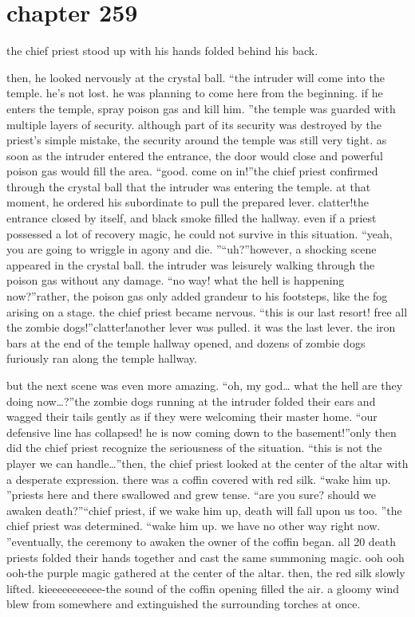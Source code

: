 \section{chapter 259}

                            the chief priest stood up with his hands folded behind his back.





then, he looked nervously at the crystal ball.
“the intruder will come into the temple.
 he’s not lost.
 he was planning to come here from the beginning.
 if he enters the temple, spray poison gas and kill him.
”the temple was guarded with multiple layers of security.
 although part of its security was destroyed by the priest’s simple mistake, the security around the temple was still very tight.
as soon as the intruder entered the entrance, the door would close and powerful poison gas would fill the area.
“good.
 come on in!”the chief priest confirmed through the crystal ball that the intruder was entering the temple.
at that moment, he ordered his subordinate to pull the prepared lever.
clatter!the entrance closed by itself, and black smoke filled the hallway.
 even if a priest possessed a lot of recovery magic, he could not survive in this situation.
“yeah, you are going to wriggle in agony and die.
”“uh?”however, a shocking scene appeared in the crystal ball.
 the intruder was leisurely walking through the poison gas without any damage.
“no way! what the hell is happening now?”rather, the poison gas only added grandeur to his footsteps, like the fog arising on a stage.
the chief priest became nervous.
“this is our last resort! free all the zombie dogs!”clatter!another lever was pulled.
 it was the last lever.
 the iron bars at the end of the temple hallway opened, and dozens of zombie dogs furiously ran along the temple hallway.

but the next scene was even more amazing.
“oh, my god… what the hell are they doing now…?”the zombie dogs running at the intruder folded their ears and wagged their tails gently as if they were welcoming their master home.
“our defensive line has collapsed! he is now coming down to the basement!”only then did the chief priest recognize the seriousness of the situation.
“this is not the player we can handle…”then, the chief priest looked at the center of the altar with a desperate expression.
there was a coffin covered with red silk.
“wake him up.
”priests here and there swallowed and grew tense.
“are you sure? should we awaken death?”“chief priest, if we wake him up, death will fall upon us too.
”the chief priest was determined.
“wake him up.
 we have no other way right now.
”eventually, the ceremony to awaken the owner of the coffin began.
 all 20 death priests folded their hands together and cast the same summoning magic.
ooh ooh ooh-the purple magic gathered at the center of the altar.
 then, the red silk slowly lifted.
kieeeeeeeeeee-the sound of the coffin opening filled the air.
 a gloomy wind blew from somewhere and extinguished the surrounding torches at once.

